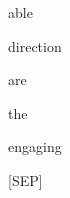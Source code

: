 \documentclass[varwidth=150mm]{standalone}
\begin{document}
\begin{CJK*}{UTF8}{gbsn}
{{{\colorbox{red!0.0}{\strut able} \colorbox{red!1.979953646659851}{\strut direction} \colorbox{red!17.417207717895508}{\strut are} \colorbox{red!37.27693557739258}{\strut the} \colorbox{red!27.467586517333984}{\strut engaging} \colorbox{red!14.764442443847656}{\strut [SEP]}
}}}
\end{CJK*}
\end{document}
